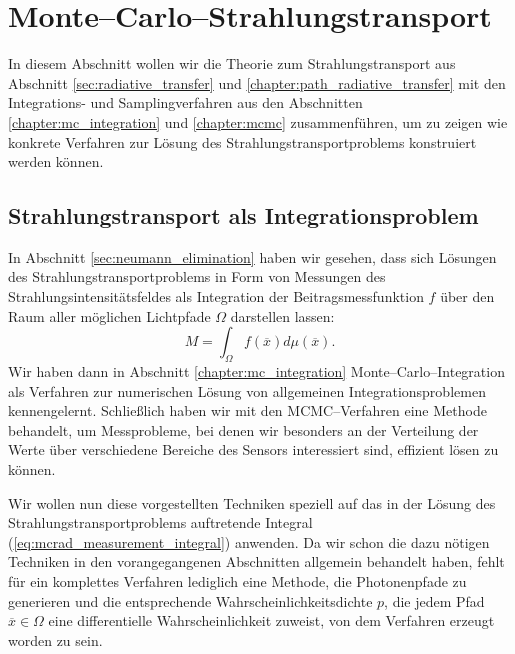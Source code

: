 	\chapter{Monte--Carlo--Strahlungstransport}\label{sec:mc_radiativetransfer}
	In diesem Abschnitt wollen wir die Theorie zum Strahlungstransport aus Abschnitt \ref{sec:radiative_transfer} und \ref{chapter:path_radiative_transfer} mit den Integrations- und Samplingverfahren aus den Abschnitten \ref{chapter:mc_integration} und \ref{chapter:mcmc} zusammenführen, um zu zeigen wie konkrete Verfahren zur Lösung des Strahlungstransportproblems konstruiert werden können.
	\section{Strahlungstransport als Integrationsproblem}
	In Abschnitt \ref{sec:neumann_elimination} haben wir gesehen, dass sich Lösungen des Strahlungstransportproblems in Form von Messungen des Strahlungsintensitätsfeldes als Integration der Beitragsmessfunktion $f$ über den Raum aller möglichen Lichtpfade $\Omega$ darstellen lassen:
	\begin{equation}
		M=\int_\Omega f({\overline x})d\mu({\overline x}).
		\label{eq:mcrad_measurement_integral}
	\end{equation}
	Wir haben dann in Abschnitt \ref{chapter:mc_integration} Monte--Carlo--Integration als Verfahren zur numerischen Lösung von allgemeinen Integrationsproblemen kennengelernt. Schließlich haben wir mit den MCMC--Verfahren eine Methode behandelt, um Messprobleme, bei denen wir besonders an der Verteilung der Werte über verschiedene Bereiche des Sensors interessiert sind, effizient lösen zu können.
	
	Wir wollen nun diese vorgestellten Techniken speziell auf das in der Lösung des Strahlungstransportproblems auftretende Integral (\ref{eq:mcrad_measurement_integral}) anwenden. Da wir schon die dazu nötigen Techniken in den vorangegangenen Abschnitten allgemein behandelt haben, fehlt für ein komplettes Verfahren lediglich eine Methode, die Photonenpfade zu generieren und die entsprechende Wahrscheinlichkeitsdichte $p$, die jedem Pfad ${\overline x}\in\Omega$ eine differentielle Wahrscheinlichkeit zuweist, von dem Verfahren erzeugt worden zu sein.
	

